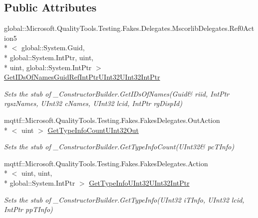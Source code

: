 \subsection*{Public Attributes}
\begin{DoxyCompactItemize}
\item 
global\-::\-Microsoft.\-Quality\-Tools.\-Testing.\-Fakes.\-Delegates.\-Mscorlib\-Delegates.\-Ref0\-Action5\\*
$<$ global\-::\-System.\-Guid, \\*
global\-::\-System.\-Int\-Ptr, uint, \\*
uint, global\-::\-System.\-Int\-Ptr $>$ \hyperlink{class_system_1_1_runtime_1_1_interop_services_1_1_fakes_1_1_stub___constructor_builder_a787850bc73dd1e9924c4b90c4926ac0a}{Get\-I\-Ds\-Of\-Names\-Guid\-Ref\-Int\-Ptr\-U\-Int32\-U\-Int32\-Int\-Ptr}
\begin{DoxyCompactList}\small\item\em Sets the stub of \-\_\-\-Constructor\-Builder.\-Get\-I\-Ds\-Of\-Names(Guid\& riid, Int\-Ptr rgsz\-Names, U\-Int32 c\-Names, U\-Int32 lcid, Int\-Ptr rg\-Disp\-Id)\end{DoxyCompactList}\item 
mqttf\-::\-Microsoft.\-Quality\-Tools.\-Testing.\-Fakes.\-Fakes\-Delegates.\-Out\-Action\\*
$<$ uint $>$ \hyperlink{class_system_1_1_runtime_1_1_interop_services_1_1_fakes_1_1_stub___constructor_builder_a69b311c7f86475e61c5551e302b5bf74}{Get\-Type\-Info\-Count\-U\-Int32\-Out}
\begin{DoxyCompactList}\small\item\em Sets the stub of \-\_\-\-Constructor\-Builder.\-Get\-Type\-Info\-Count(U\-Int32\& pc\-T\-Info)\end{DoxyCompactList}\item 
mqttf\-::\-Microsoft.\-Quality\-Tools.\-Testing.\-Fakes.\-Fakes\-Delegates.\-Action\\*
$<$ uint, uint, \\*
global\-::\-System.\-Int\-Ptr $>$ \hyperlink{class_system_1_1_runtime_1_1_interop_services_1_1_fakes_1_1_stub___constructor_builder_a766516f4bf112687ee49344323574956}{Get\-Type\-Info\-U\-Int32\-U\-Int32\-Int\-Ptr}
\begin{DoxyCompactList}\small\item\em Sets the stub of \-\_\-\-Constructor\-Builder.\-Get\-Type\-Info(\-U\-Int32 i\-T\-Info, U\-Int32 lcid, Int\-Ptr pp\-T\-Info)\end{DoxyCompactList}\item 

\end{DoxyCompactItemize}
